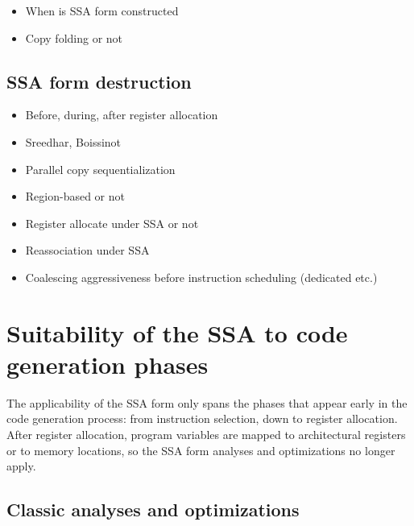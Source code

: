 \begin{itemize}

\item When is SSA form constructed

\item Copy folding or not

\end{itemize}

\subsection{SSA form destruction}

\begin{itemize}

\item Before, during, after register allocation

\item Sreedhar, Boissinot

\item Parallel copy sequentialization

\end{itemize}

\begin{itemize}

\item Region-based or not

\item Register allocate under SSA or not

\item Reassociation under SSA

\item Coalescing aggressiveness before instruction scheduling (dedicated etc.)

\end{itemize}


\section{Suitability of the SSA to code generation phases}
\label{sec:ssa-codegen-suitability}

The applicability of the SSA form only spans the phases that appear
early in the code generation process: from instruction selection, down to
register allocation. After register allocation, program variables are mapped to
architectural registers or to memory locations, so the SSA form analyses and
optimizations no longer apply.

\subsection{Classic analyses and optimizations}

